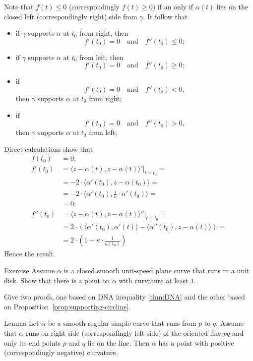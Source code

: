 Note that $f(t)\le0$ (correspondingly $f(t)\ge0$) 
if an only if $\alpha(t)$ lies on the closed left (correspondingly right) side from $\gamma$.
It follow that 
\begin{itemize}
\item if $\gamma$ supports $\alpha$ at $t_0$ from right, 
then
\[f'(t_0)=0\quad\text{and}\quad f''(t_0)\le 0;\]

\item if $\gamma$ supports $\alpha$ at $t_0$ from  left, 
then 
\[f'(t_0)=0\quad\text{and}\quad f''(t_0)\ge 0;\]

\item if 
\[f'(t_0)=0\quad\text{and}\quad f''(t_0)< 0,\]
then $\gamma$ supports $\alpha$ at $t_0$ from  right;

\item if 
\[f'(t_0)=0\quad\text{and}\quad f''(t_0)> 0,\] then $\gamma$ supports $\alpha$ at $t_0$ from  left;
\end{itemize}

Direct calculations show that
\begin{align*}
f(t_0)&=0;
\\
f'(t_0)&=\left.\langle z-\alpha(t),z-\alpha(t) \rangle'\right|_{t=t_0}=
\\
&=-2\cdot \langle \alpha'(t_0),z-\alpha(t_0) \rangle=
\\&=-2\cdot \langle \alpha'(t_0),\tfrac i\kappa \cdot\alpha'(t_0) \rangle=
\\
&=0;
\\
f''(t_0)&=\langle z-\alpha(t),z-\alpha(t) \rangle''|_{t=t_0}=
\\
&=2\cdot\left( \langle \alpha'(t_0),\alpha'(t) \rangle-\langle \alpha''(t_0),z-\alpha(t) \rangle \right)=
\\
&=2\cdot\left(1-\kappa\cdot \frac1{\kappa(t_0)}\right)
\end{align*}
Hence the result.\qeds


\begin{thm}{Exercise}
Assume $\alpha$ is a closed smooth unit-speed plane curve that runs in a unit disk.
Show that there is a point on $\alpha$ with curvature at least $1$.

Give two proofs, one based on DNA inequality \ref{thm:DNA} and the other based on Proposition~\ref{prop:supporting-circline}.
\end{thm}

\begin{thm}{Lemma}
Let $\alpha$ be a smooth regular simple curve that runs from $p$ to $q$.
Assume that $\alpha$ runs on right side (correspondingly left side) of the oriented line $pq$ and only its end points $p$ and $q$ lie on the line.
Then $\alpha$ has a point with positive  (correspondingly negative) curvature.
\end{thm}

